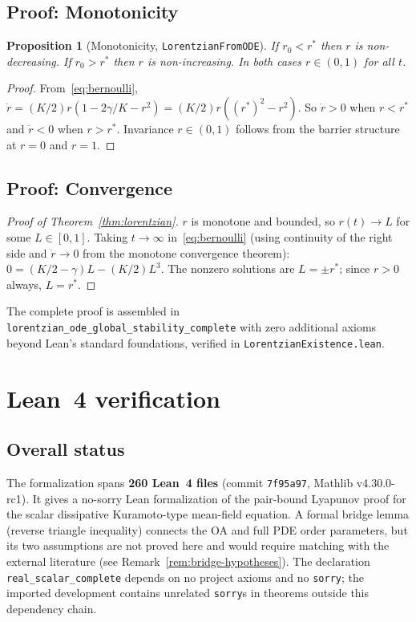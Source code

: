 \documentclass[11pt,a4paper]{article}
\newtheorem{proposition}[theorem]{Proposition}
\theoremstyle{definition}
\begin{document}
\subsection{Proof: Monotonicity}\label{sec:mono}

\begin{proposition}[Monotonicity, \texttt{LorentzianFromODE}]\label{prop:mono}
If $r_0 < r^*$ then $r$ is non-decreasing. If $r_0 > r^*$ then $r$ is non-increasing. In both cases $r \in (0,1)$ for all $t$.
\end{proposition}

\begin{proof}
From~\eqref{eq:bernoulli}, $\dot{r} = (K/2)r(1-2\gamma/K - r^2) = (K/2)r((r^*)^2 - r^2)$. So $\dot{r} > 0$ when $r < r^*$ and $\dot{r} < 0$ when $r > r^*$. Invariance $r \in (0,1)$ follows from the barrier structure at $r = 0$ and $r = 1$.
\end{proof}

\subsection{Proof: Convergence}

\begin{proof}[Proof of Theorem~\ref{thm:lorentzian}]
$r$ is monotone and bounded, so $r(t) \to L$ for some $L \in [0,1]$. Taking $t \to \infty$ in~\eqref{eq:bernoulli} (using continuity of the right side and $\dot{r} \to 0$ from the monotone convergence theorem): $0 = (K/2 - \gamma)L - (K/2)L^3$. The nonzero solutions are $L = \pm r^*$; since $r > 0$ always, $L = r^*$.
\end{proof}

The complete proof is assembled in \texttt{lorentzian\_ode\_global\_stability\_complete} with zero additional axioms beyond Lean's standard foundations, verified in \texttt{LorentzianExistence.lean}.

\section{Lean~4 verification}\label{sec:lean}

\subsection{Overall status}

The formalization spans \textbf{260 Lean~4 files} (commit \texttt{7f95a97}, Mathlib v4.30.0-rc1). It gives a no-sorry Lean formalization of the pair-bound Lyapunov proof for the scalar dissipative Kuramoto-type mean-field equation. A formal bridge lemma (reverse triangle inequality) connects the OA and full PDE order parameters, but its two assumptions are not proved here and would require matching with the external literature (see Remark~\ref{rem:bridge-hypotheses}). The declaration \texttt{real\_scalar\_complete} depends on no project axioms and no \texttt{sorry}; the imported development contains unrelated \texttt{sorry}s in theorems outside this dependency chain.
\end{document}
